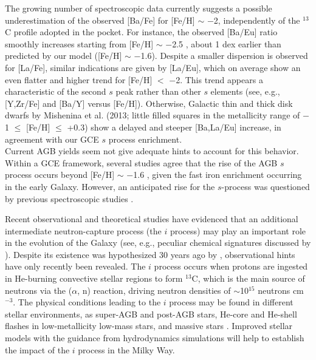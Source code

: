 \documentclass[manuscript]{aastex}
\begin{document}
The growing number of spectroscopic data currently suggests a possible 
underestimation of the observed [Ba/Fe] for [Fe/H] $\sim$ $-$2, 
independently of the $^{13}$C profile adopted in the pocket. 
For instance, the observed [Ba/Eu] ratio smoothly increases starting
from [Fe/H] $\sim$ $-$2.5 \citep{roederer14a,ishigaki13,hansen12}, 
about 1 dex earlier than predicted by our model ([Fe/H] $\sim$ $-$1.6). 
Despite a smaller dispersion is observed for [La/Fe], similar indications
are given by [La/Eu], which on average show an even flatter and higher trend
for [Fe/H] $<$ $-$2.
This trend appears a characteristic of the second $s$ peak  
rather than other $s$ elements (see, e.g., [Y,Zr/Fe]
and [Ba/Y] versus [Fe/H]). 
Otherwise, Galactic thin and thick disk dwarfs by  
Mishenina et al. (2013; little filled squares in the metallicity range of $-$1 $\leq$ 
[Fe/H] $\leq$ +0.3) show a delayed and steeper [Ba,La/Eu] increase, in agreement 
with our GCE $s$ process enrichment.
\\
Current AGB yields seem not give adequate hints to account for this behavior.
Within a GCE framework, several studies agree that the rise of the AGB $s$ process
occurs beyond [Fe/H] $\sim$ $-$1.6 \citep{matteucci09,kobayashi09}, given the fast
iron enrichment occurring in the early Galaxy.
However, an anticipated rise for the $s$-process was questioned by previous spectroscopic
studies \citep{simmerer04,hansen12}.

 Recent observational and theoretical studies have evidenced that an additional 
intermediate neutron-capture process (the $i$ process) may play an important 
role in the evolution of the Galaxy (see, e.g., peculiar chemical signatures
discussed by \citealt{roederer16,mishenina15a,dardelet15,lugaro15,jadhav13,liu14}).
Despite its existence was hypothesized 30 years ago by \citet{cowan77}, observational
hints have only recently been revealed.
The $i$ process occurs when protons are ingested in He-burning convective stellar 
regions to form $^{13}$C, which is the main source of neutrons via the ($\alpha$, n) 
reaction, driving neutron densities of $\sim$10$^{15}$ neutrons cm$^{-3}$.
The physical conditions leading to the $i$ process may be found in different stellar
environments, as super-AGB and post-AGB stars, He-core and He-shell flashes in 
low-metallicity low-mass stars, and massive stars 
\citep{cristallo09,herwig11,stancliffe11,jones16,wood15}.
Improved stellar models with the guidance from hydrodynamics simulations will help to
establish the impact of the $i$ process in the Milky Way. 
 
\end{document}
